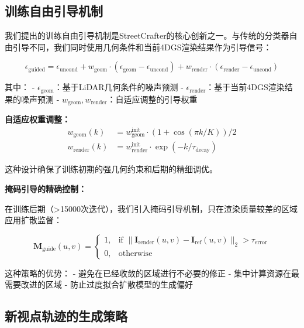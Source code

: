 \subsection{训练自由引导机制}

我们提出的训练自由引导机制是StreetCrafter的核心创新之一。与传统的分类器自由引导不同，我们同时使用几何条件和当前4DGS渲染结果作为引导信号：

\begin{equation}
\epsilon_{\text{guided}} = \epsilon_{\text{uncond}} + w_{\text{geom}} \cdot (\epsilon_{\text{geom}} - \epsilon_{\text{uncond}}) + w_{\text{render}} \cdot (\epsilon_{\text{render}} - \epsilon_{\text{uncond}})
\label{eq:dual_guidance}
\end{equation}

其中：
- $\epsilon_{\text{geom}}$：基于LiDAR几何条件的噪声预测
- $\epsilon_{\text{render}}$：基于当前4DGS渲染结果的噪声预测
- $w_{\text{geom}}, w_{\text{render}}$：自适应调整的引导权重

\textbf{自适应权重调整：}
\begin{align}
w_{\text{geom}}(k) &= w_{\text{geom}}^{\text{init}} \cdot (1 + \cos(\pi k / K)) / 2 \\
w_{\text{render}}(k) &= w_{\text{render}}^{\text{init}} \cdot \exp(-k / \tau_{\text{decay}})
\label{eq:adaptive_guidance_weights}
\end{align}

这种设计确保了训练初期的强几何约束和后期的精细调优。

\textbf{掩码引导的精确控制：}

在训练后期（>15000次迭代），我们引入掩码引导机制，只在渲染质量较差的区域应用扩散监督：

\begin{equation}
\mathbf{M}_{\text{guide}}(u,v) = \begin{cases}
1, & \text{if } \|\mathbf{I}_{\text{render}}(u,v) - \mathbf{I}_{\text{ref}}(u,v)\|_2 > \tau_{\text{error}} \\
0, & \text{otherwise}
\end{cases}
\label{eq:masked_guidance}
\end{equation}

这种策略的优势：
- 避免在已经收敛的区域进行不必要的修正
- 集中计算资源在最需要改进的区域
- 防止过度拟合扩散模型的生成偏好

\subsection{新视点轨迹的生成策略}

